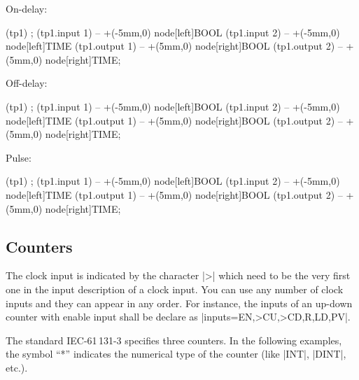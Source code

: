 \documentclass[a4paper]{ltxdoc}
\begin{document}
\noindent{}On-delay:
\begin{codeexample}[width=6cm,pre={\begin{tikzpicture}[circuit plc ladder,thick]},post=\end{tikzpicture}]
\node[block,inputs={IN,PT},outputs={Q,ET},
   symbol=TON,minimum width=18mm] (tp1) {};
\draw (tp1.input 1) -- +(-5mm,0) node[left]{BOOL}
      (tp1.input 2) -- +(-5mm,0) node[left]{TIME}
      (tp1.output 1) -- +(5mm,0) node[right]{BOOL}
      (tp1.output 2) -- +(5mm,0) node[right]{TIME};
\end{codeexample}

\noindent{}Off-delay:
\begin{codeexample}[width=6cm,pre={\begin{tikzpicture}[circuit plc ladder,thick]},post=\end{tikzpicture}]
\node[block,inputs={IN,PT},outputs={Q,ET},
   symbol=TOF,minimum width=18mm] (tp1) {};
\draw (tp1.input 1) -- +(-5mm,0) node[left]{BOOL}
      (tp1.input 2) -- +(-5mm,0) node[left]{TIME}
      (tp1.output 1) -- +(5mm,0) node[right]{BOOL}
      (tp1.output 2) -- +(5mm,0) node[right]{TIME};
\end{codeexample}

\noindent{}Pulse:
\begin{codeexample}[width=6cm,pre={\begin{tikzpicture}[circuit plc ladder,thick]},post=\end{tikzpicture}]
\node[block,inputs={IN,PT},outputs={Q,ET},
   symbol=TP,minimum width=18mm] (tp1) {};
\draw (tp1.input 1) -- +(-5mm,0) node[left]{BOOL}
      (tp1.input 2) -- +(-5mm,0) node[left]{TIME}
      (tp1.output 1) -- +(5mm,0) node[right]{BOOL}
      (tp1.output 2) -- +(5mm,0) node[right]{TIME};
\end{codeexample}

\subsection{Counters}
The clock input is indicated by the character |>| which need to be the very first one in the input description of a clock input. You can use any number of clock inputs and they can appear in any order. For instance, the inputs of an up-down counter with enable input shall be declare as |inputs={EN,>CU,>CD,R,LD,PV}|. 

The standard IEC-61\,131-3 specifies three counters. In the following examples, the symbol ``*'' indicates the numerical type of the counter (like |INT|, |DINT|, etc.).
\end{document}
